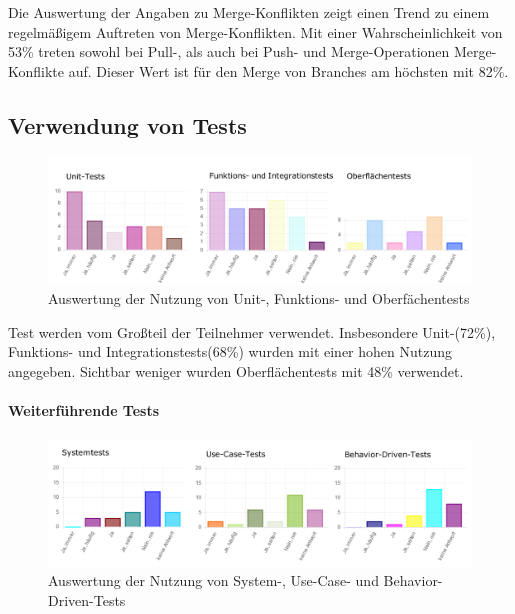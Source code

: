 Die Auswertung der Angaben zu Merge-Konflikten zeigt einen Trend zu einem regelmäßigem Auftreten von Merge-Konflikten. Mit einer Wahrscheinlichkeit von 53\% treten sowohl bei Pull-, als auch bei Push- und Merge-Operationen Merge-Konflikte auf. Dieser Wert ist für den Merge von Branches am höchsten mit 82\%. 

\subsection{Verwendung von Tests}

\begin{figure}[htbp]
  \includegraphics[width=\textwidth, height=\textheight, keepaspectratio]
    {resources/survey-test-usage.pdf}
  \caption{Auswertung der Nutzung von Unit-, Funktions- und Oberfächentests}
\end{figure}

Test werden vom Großteil der Teilnehmer verwendet. Insbesondere Unit-(72\%), Funktions- und Integrationstests(68\%) wurden mit einer hohen Nutzung angegeben. Sichtbar weniger wurden Oberflächentests mit 48\% verwendet.

\paragraph{Weiterführende Tests}

\begin{figure}[htbp]
  \includegraphics[width=\textwidth, height=\textheight, keepaspectratio]
    {resources/survey-test-usage-special.pdf}
  \caption{Auswertung der Nutzung von System-, Use-Case- und Behavior-Driven-Tests}
\end{figure}

